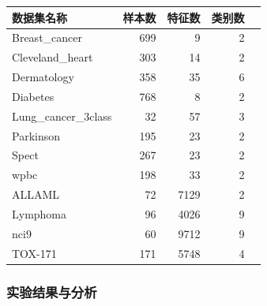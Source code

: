 \documentclass{wzuthesis}
\begin{document}
\begin{table}[htbp]
    \centering
    \small
      \begin{tabular}{lrrrr}
        \toprule
      数据集名称 & \multicolumn{1}{l}{样本数} & \multicolumn{1}{l}{特征数} & \multicolumn{1}{l}{类别数} \\
      \midrule
      Breast\_cancer & 699   & 9     & 2 \\
      Cleveland\_heart & 303   & 14    & 2 \\
      Dermatology & 358   & 35    & 6 \\
      Diabetes & 768   & 8     & 2 \\
      Lung\_cancer\_3class & 32    & 57    & 3 \\
      Parkinson & 195   & 23    & 2 \\
      Spect & 267   & 23    & 2 \\
      wpbc  & 198   & 33    & 2 \\
      ALLAML & 72    & 7129  & 2 \\
      Lymphoma & 96    & 4026  & 9 \\
      nci9  & 60    & 9712  & 9 \\
      TOX-171 & 171   & 5748  & 4 \\
      \bottomrule
      \end{tabular}%
    \label{tb:irime-datasets-info}%
\end{table}%

\subsubsection{实验结果与分析}
\end{document}
